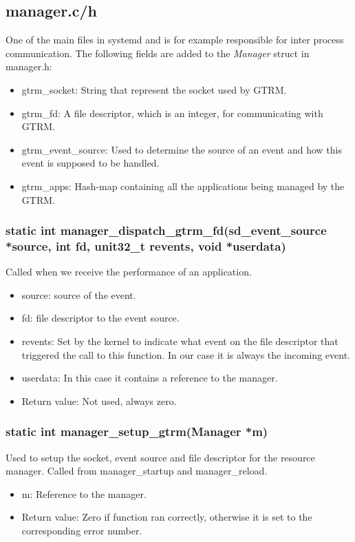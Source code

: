 \documentclass[nobiblatex]{LTHthesis}
\begin{document}
\subsection{manager.c/h}
One of the main files in systemd and is for example responsible for inter process communication. The following fields are added to the \emph{Manager} struct in manager.h:
\begin{itemize}
\item gtrm\_socket: String that represent the socket used by GTRM.
\item gtrm\_fd: A file descriptor, which is an integer, for communicating with GTRM.
\item gtrm\_event\_source: Used to determine the source of an event and how this event is supposed to be handled.
\item gtrm\_apps: Hash-map containing all the applications being managed by the GTRM.
\end{itemize}



\subsubsection{static int manager\_dispatch\_gtrm\_fd(sd\_event\_source *source, int fd, unit32\_t revents, void *userdata)}
Called when we receive the performance of an application.
\begin{itemize}
\item source: source of the event.
\item fd: file descriptor to the event source.
\item revents: Set by the kernel to indicate what event on the file descriptor that triggered the call to this function. In our case it is always the incoming event.
\item userdata: In this case it contains a reference to the manager.
\item Return value: Not used, always zero.
\end{itemize}

\subsubsection{static int manager\_setup\_gtrm(Manager *m)}
Used to setup the socket, event source and file descriptor for the resource manager. Called from manager\_startup and manager\_reload.
\begin{itemize}
\item m: Reference to the manager.
\item Return value: Zero if function ran correctly, otherwise it is set to the corresponding error number.
\end{itemize}
\end{document}
